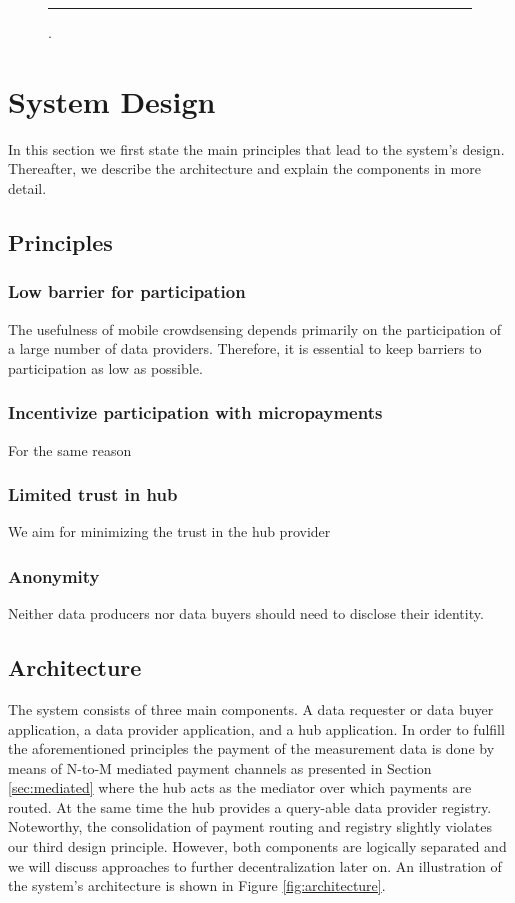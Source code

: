 \documentclass[10pt,journal,compsoc]{IEEEtran}
\begin{document}
\begin{figure}
\rule{8cm}{4cm}.
\end{figure}

\section{System Design}

In this section we first state the main principles that lead to the system's design. Thereafter, we describe the architecture and explain the components in more detail.

\subsection{Principles}

\subsubsection{Low barrier for participation}
The usefulness of mobile crowdsensing depends primarily on the participation of a large number of data providers. Therefore, it is essential to keep barriers to participation as low as possible.

\subsubsection{Incentivize participation with micropayments}
For the same reason  

\subsubsection{Limited trust in hub}
We aim for minimizing the trust in the hub provider

\subsubsection{Anonymity}
Neither data producers nor data buyers should need to disclose their identity. 

\subsection{Architecture}
The system consists of three main components. A data requester or data buyer application, a data provider application, and a hub application. In order to fulfill the aforementioned principles the payment of the measurement data is done by means of N-to-M mediated payment channels as presented in Section \ref{sec:mediated} where the hub acts as the mediator over which payments are routed. At the same time the hub provides a query-able data provider registry. Noteworthy, the consolidation of payment routing and registry slightly violates our third design principle. However, both components are logically separated and we will discuss approaches to further decentralization later on. An illustration of the system's architecture is shown in Figure \ref{fig:architecture}.
\end{document}
